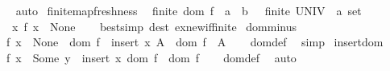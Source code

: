 \begin{isabellebody}
%
\isadelimproof
\ \ %
\endisadelimproof
%
\isatagproof
{}\isamarkupfalse%
\ auto%
\endisatagproof
{\isafoldproof}%
%
\isadelimproof
\isanewline
%
\endisadelimproof
\isanewline
\isanewline
{}\isamarkupfalse%
\ finite{\isacharunderscore}{\kern0pt}map{\isacharunderscore}{\kern0pt}freshness{\isacharcolon}{\kern0pt}\isanewline
\ \ {\isachardoublequoteopen}finite\ {\isacharparenleft}{\kern0pt}dom\ {\isacharparenleft}{\kern0pt}f\ {\isacharcolon}{\kern0pt}{\isacharcolon}{\kern0pt}\ {\isacharprime}{\kern0pt}a\ {\isasymrightharpoonup}\ {\isacharprime}{\kern0pt}b{\isacharparenright}{\kern0pt}{\isacharparenright}{\kern0pt}\ {\isasymLongrightarrow}\ {\isasymnot}\ finite\ {\isacharparenleft}{\kern0pt}UNIV\ {\isacharcolon}{\kern0pt}{\isacharcolon}{\kern0pt}\ {\isacharprime}{\kern0pt}a\ set{\isacharparenright}{\kern0pt}\ {\isasymLongrightarrow}\isanewline
\ \ \ {\isasymexists}x{\isachardot}{\kern0pt}\ f\ x\ {\isacharequal}{\kern0pt}\ None{\isachardoublequoteclose}\isanewline
%
\isadelimproof
\ \ %
\endisadelimproof
%
\isatagproof
{}\isamarkupfalse%
\ {\isacharparenleft}{\kern0pt}bestsimp\ dest{\isacharcolon}{\kern0pt}\ ex{\isacharunderscore}{\kern0pt}new{\isacharunderscore}{\kern0pt}if{\isacharunderscore}{\kern0pt}finite{\isacharparenright}{\kern0pt}%
\endisatagproof
{\isafoldproof}%
%
\isadelimproof
\isanewline
%
\endisadelimproof
\isanewline
{}\isamarkupfalse%
\ dom{\isacharunderscore}{\kern0pt}minus{\isacharcolon}{\kern0pt}\isanewline
\ \ {\isachardoublequoteopen}f\ x\ {\isacharequal}{\kern0pt}\ None\ {\isasymLongrightarrow}\ dom\ f\ {\isacharminus}{\kern0pt}\ insert\ x\ A\ {\isacharequal}{\kern0pt}\ dom\ f\ {\isacharminus}{\kern0pt}\ A{\isachardoublequoteclose}\isanewline
%
\isadelimproof
\ \ %
\endisadelimproof
%
\isatagproof
{}\isamarkupfalse%
\ dom{\isacharunderscore}{\kern0pt}def\ \isamarkupfalse%
\ simp%
\endisatagproof
{\isafoldproof}%
%
\isadelimproof
\isanewline
%
\endisadelimproof
\isanewline
{}\isamarkupfalse%
\ insert{\isacharunderscore}{\kern0pt}dom{\isacharcolon}{\kern0pt}\isanewline
\ \ {\isachardoublequoteopen}f\ x\ {\isacharequal}{\kern0pt}\ Some\ y\ {\isasymLongrightarrow}\ insert\ x\ {\isacharparenleft}{\kern0pt}dom\ f{\isacharparenright}{\kern0pt}\ {\isacharequal}{\kern0pt}\ dom\ f{\isachardoublequoteclose}\isanewline
%
\isadelimproof
\ \ %
\endisadelimproof
%
\isatagproof
{}\isamarkupfalse%
\ dom{\isacharunderscore}{\kern0pt}def\ \isamarkupfalse%
\ auto%
\endisatagproof
{\isafoldproof}%
%
\isadelimproof

\end{isabellebody}
